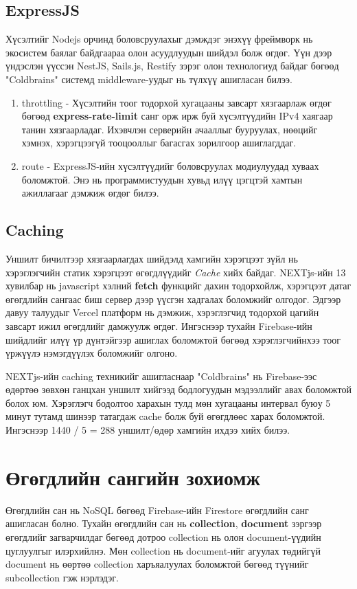\subsection{ExpressJS}
Хүсэлтийг Nodejs орчинд боловсруулахыг дэмждэг энэхүү фреймворк нь экосистем баялаг байдгаараа олон асуудлуудын шийдэл болж өгдөг. Үүн дээр үндэслэн үүссэн NestJS, Sails.js, Restify зэрэг олон технологиуд байдаг бөгөөд "Coldbrains" системд middleware-уудыг нь түлхүү ашигласан билээ. 
\begin{enumerate}
  \item throttling - Хүсэлтийн тоог тодорхой хугацааны завсарт хязгаарлаж өгдөг бөгөөд \textbf{express-rate-limit} санг орж ирж буй хүсэлтүүдийн IPv4 хаягаар танин хязгаарладаг. Ихэвчлэн серверийн ачааллыг бууруулах, нөөцийг хэмнэх, хэрэгцээгүй тооцооллыг багасгах зорилгоор ашиглагддаг. 
  \item route - ExpressJS-ийн хүсэлтүүдийг боловсруулах модиулуудад хуваах боломжтой. Энэ нь программистуудын хувьд илүү цэгцтэй хамтын ажиллагааг дэмжиж өгдөг билээ.
\end{enumerate}

\subsection{Caching}
Уншилт бичилтээр хязгаарлагдах шийдэлд хамгийн хэрэгцээт зүйл нь хэрэглэгчийн статик хэрэгцээт өгөгдлүүдийг \textit{Cache} хийх байдаг. NEXTjs-ийн 13 хувилбар нь javascript хэлний \textbf{fetch} функцийг дахин тодорхойлж, хэрэгцээт датаг өгөгдлийн сангаас биш сервер дээр үүсгэн хадгалах боломжийг олгодог. Эдгээр давуу талуудыг Vercel платформ нь дэмжиж, хэрэглэгчид тодорхой цагийн завсарт ижил өгөгдлийг дамжуулж өгдөг. Ингэснээр тухайн Firebase-ийн шийдлийг илүү үр дүнтэйгээр ашиглах боломжтой бөгөөд хэрэглэгчийнхээ тоог үржүүлэ нэмэгдүүлэх боломжийг олгоно. 

NEXTjs-ийн caching техникийг ашигласнаар "Coldbrains" нь Firebase-ээс өдөртөө зөвхөн ганцхан уншилт хийгээд бодлогуудын мэдээллийг авах боломжтой болох юм. Хэрэглэгч бодолтоо харахын тулд мөн хугацааны интервал буюу 5 минут тутамд шинээр татагдаж cache болж буй өгөгдлөөс харах боломжтой. Ингэснээр 1440 / 5 = 288 уншилт/өдөр хамгийн ихдээ хийх билээ.

\section{Өгөгдлийн сангийн зохиомж}
Өгөгдлийн сан нь NoSQL бөгөөд Firebase-ийн Firestore өгөгдлийн санг ашигласан болно. Тухайн өгөгдлийн сан нь \textbf{collection}, \textbf{document} зэргээр өгөгдлийг загварчилдаг бөгөөд дотроо collection нь олон document-үүдийн цуглуулгыг илэрхийлнэ. Мөн collection нь document-ийг агуулах төдийгүй document нь өөртөө collection харъяалуулах боломжтой бөгөөд түүнийг subcollection гэж нэрлэдэг. 

